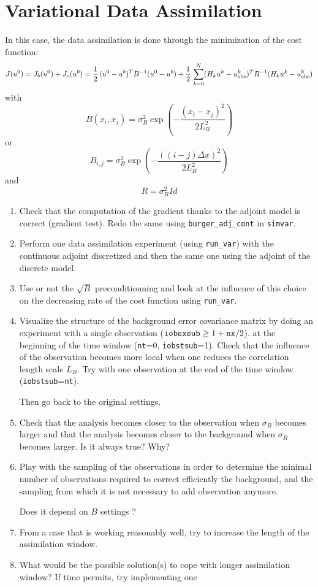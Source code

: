 \documentclass[11pt,a4paper]{article}
\begin{document}
\section{Variational Data Assimilation} 
In this case, the data assimilation is done through the minimization of the cost function:
$$
J(u^0) = J_b(u^0) + J_o(u^0) = \frac{1}{2}\, (u^0-u^b)^TB^{-1}(u^0-u^b) + \frac{1}{2}\, \sum_{k=0}^N  (H_k u^k-u^k_{\hbox{\scriptsize obs}})^TR^{-1}(H_k u^k-u^k_{\hbox{\scriptsize obs}})
$$
%
with
%
$$
B(x_i, x_j) = \sigma_B^2 \exp\left(-\frac{(x_i-x_j)^2}{2L_B^2}\right)
$$
%
or
%
$$
B_{i,j} = \sigma_B^2 \exp\left(-\frac{((i-j)\Delta x)^2}{2L_B^2}\right)
$$
%
and
%
$$ R=\sigma_R^2 Id $$
%
%
\begin{enumerate}
\item  Check that the computation of the gradient thanks to the adjoint model is correct (gradient test). Redo the same using \texttt{burger\_adj\_cont} in \texttt{simvar}.
\item Perform one data assimilation experiment (using \texttt{run\_{var}}) with the continuous adjoint discretized and then the same one using the adjoint of the discrete model.
\item Use or not the $\sqrt{B}$ preconditionning and look at the influence of this choice on the decreasing rate of the cost function using  \texttt{run\_{var}}.
\item Visualize the structure of the background error covariance matrix by doing an experiment with a single observation (${\tt iobsxsub}\geq1+{\tt nx}/{2}$). at the beginning of the time window ({\tt nt}=0, {\tt iobstsub}=1). Check that the influence of the observation becomes more local when one reduces the correlation length scale $L_B$. Try with one observation at the end of the time window ({\tt iobstsub}={\tt nt}). 

Then go back to the original settings.

\item Check that the analysis becomes closer to the observation when $\sigma_B$ becomes larger and that the analysis becomes closer to the background when $\sigma_R$ becomes larger. Is it always true? Why?

\item Play with the sampling of the observations in order to determine the minimal number of observations required to correct efficiently the background, and the sampling from which it is not necessary to add observation anymore.

Does it depend on $B$ settings ?

\item From a case that is working reasonably well, try to increase the length of the assimilation window. 

\item What would be the possible solution(s) to cope with longer assimilation window? If time permits, try implementing one 
%
\end{enumerate}

 
\end{document}

